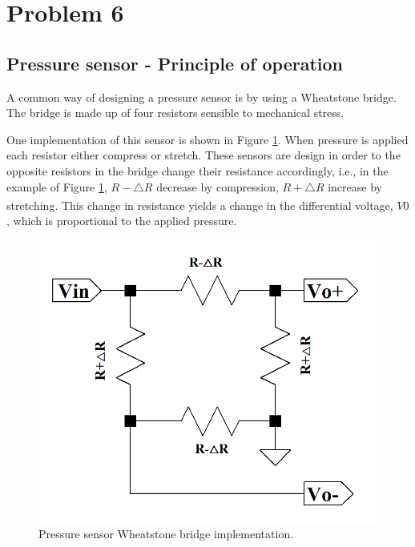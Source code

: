 \section{Problem 6}

\subsection{Pressure sensor - Principle of operation}

A common way of designing a pressure sensor is by using a Wheatstone bridge. The bridge is made up of four resistors sensible to mechanical stress. 

One implementation of this sensor is shown in Figure \ref{fig:wheatstone_bridge}. When pressure is applied each resistor either compress or stretch. These sensors are design in order to the opposite resistors in the bridge change their resistance accordingly, i.e., in the example of Figure \ref{fig:wheatstone_bridge}, $R - \triangle R$ decrease by compression, $R + \triangle R$ increase by stretching\textsuperscript{\cite{TI-Design-Resistive-Bridge-Pressure-Sensor}}. This change in resistance yields a change in the differential voltage, $V0$, which is proportional to the applied pressure.

\begin{figure}[H]
    \centering
    \includegraphics*[scale = 0.4]{images/wheatstone-bridge.png}
    \caption{Pressure sensor Wheatstone bridge implementation.} 
    \label{fig:wheatstone_bridge}
\end{figure}

